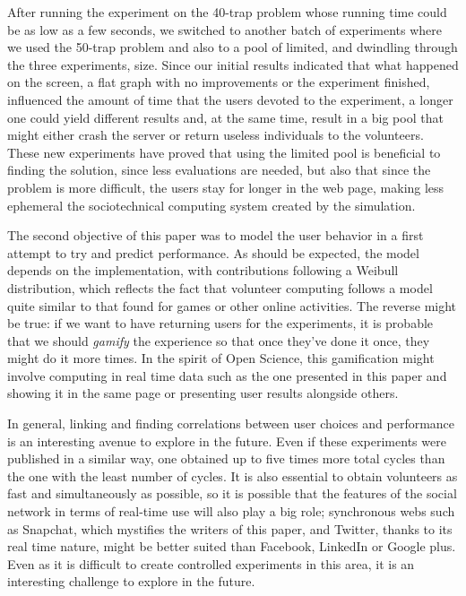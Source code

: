 \documentclass[letterpaper]{article}
\begin{document}
After running the experiment on the 40-trap problem whose running time
could be as low as a few seconds, we switched to another batch of
experiments where we used the 50-trap problem and also to a pool of
limited, and dwindling through the three experiments, size. Since our
initial results indicated that what happened on the screen, a flat
graph with no improvements or the experiment finished, influenced the
amount of time that the users devoted to the experiment, a longer one
could yield different results and, at the same time, result in a big
pool that might either crash the server or return useless individuals
to the volunteers. These new experiments have proved that using the
limited pool is beneficial to finding the solution, since less
evaluations are needed, but also that since the problem is more
difficult, the users stay for longer in the web page, making less
ephemeral the sociotechnical computing system created by the
simulation. 


The second objective of this paper was to model the user behavior in a
first attempt to try and predict performance. As should be expected,
the model depends on the implementation, with contributions following
a Weibull distribution, which reflects the fact
that volunteer computing follows a model quite similar to that found
for games or other online activities. The reverse might be true: if we
want to have returning users for the experiments, it is probable that
we should {\em gamify} the experience so that once they've done it
once, they might do it more times. In the spirit of Open Science, this
gamification might involve computing in real time data such as the one
presented in this paper and showing it in the same page or presenting
user results alongside others.

In general, linking and finding correlations between user choices and
performance is an interesting avenue to explore in the future. Even if
these  experiments were published in a similar way, one
obtained up to five times more total cycles than the one with the least
number of cycles. It is also essential to obtain volunteers as fast and
simultaneously as possible, so it is possible that the features of the
social network in terms of real-time use will also play a big
role; synchronous webs such as Snapchat, which mystifies the writers
of this paper, and Twitter, thanks to its real time nature, might be
better suited than Facebook, LinkedIn or Google plus. Even as it is
difficult to create controlled experiments in this 
area, it is an interesting challenge to explore in the future.
\end{document}
